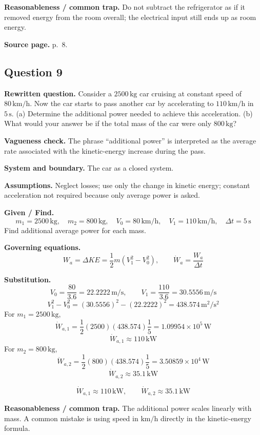 \textbf{Reasonableness / common trap.} Do not subtract the refrigerator as if it removed energy from the room overall; the electrical input still ends up as room energy.

\textbf{Source page.} p.~8.

\subsection*{Question 9}
\textbf{Rewritten question.} Consider a $2500\,\mathrm{kg}$ car cruising at constant speed of $80\,\mathrm{km/h}$. Now the car starts to pass another car by accelerating to $110\,\mathrm{km/h}$ in $5\,\mathrm{s}$. (a) Determine the additional power needed to achieve this acceleration. (b) What would your answer be if the total mass of the car were only $800\,\mathrm{kg}$?

\textbf{Vagueness check.} The phrase ``additional power'' is interpreted as the average rate associated with the kinetic-energy increase during the pass.

\textbf{System and boundary.} The car as a closed system.

\textbf{Assumptions.} Neglect losses; use only the change in kinetic energy; constant acceleration not required because only average power is asked.

\textbf{Given / Find.}
\[
m_1=2500\,\mathrm{kg},\quad m_2=800\,\mathrm{kg},\quad V_0=80\,\mathrm{km/h},\quad V_1=110\,\mathrm{km/h},\quad \Delta t=5\,\mathrm{s}
\]
Find additional average power for each mass.

\textbf{Governing equations.}
\[
W_a=\Delta KE=\frac12m\left(V_1^2-V_0^2\right),\qquad \dot W_a=\frac{W_a}{\Delta t}
\]

\textbf{Substitution.}
\[
V_0=\frac{80}{3.6}=22.2222\,\mathrm{m/s},\qquad V_1=\frac{110}{3.6}=30.5556\,\mathrm{m/s}
\]
\[
V_1^2-V_0^2=(30.5556)^2-(22.2222)^2=438.574\,\mathrm{m^2/s^2}
\]
For $m_1=2500\,\mathrm{kg}$,
\[
\dot W_{a,1}=\frac{1}{2}(2500)(438.574)\frac{1}{5}=1.09954\times10^5\,\mathrm{W}
\]
\[
\dot W_{a,1}\approx110\,\mathrm{kW}
\]
For $m_2=800\,\mathrm{kg}$,
\[
\dot W_{a,2}=\frac{1}{2}(800)(438.574)\frac{1}{5}=3.50859\times10^4\,\mathrm{W}
\]
\[
\dot W_{a,2}\approx35.1\,\mathrm{kW}
\]

\[
\boxed{\dot W_{a,1}\approx110\,\mathrm{kW}},\qquad \boxed{\dot W_{a,2}\approx35.1\,\mathrm{kW}}
\]

\textbf{Reasonableness / common trap.} The additional power scales linearly with mass. A common mistake is using speed in $\mathrm{km/h}$ directly in the kinetic-energy formula.

